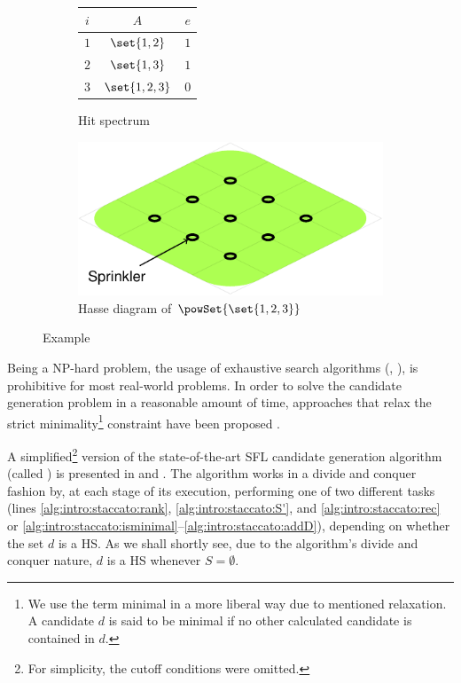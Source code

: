 \begin{figure}[ht]
  \begin{subfigure}{0.4\columnwidth}
    \begin{tabular}{c|c|c}
      $i$ & $A$           & $e$ \\\hline
      $1$ & $\set{1,2}$   & $1$ \\
      $2$ & $\set{1,3}$   & $1$ \\
      $3$ & $\set{1,2,3}$ & $0$ \\
    \end{tabular}
    \caption{Hit spectrum\label{fig:intro:spectrum-example}}
  \end{subfigure}
  \begin{subfigure}{0.45\columnwidth}
    \includegraphics[page=7]{figures/introduction/figures/main.pdf}
    \caption{Hasse diagram of $\powSet{\set{1,2,3}}$\label{fig:intro:hasse}}
  \end{subfigure}
  \caption{Example}
\end{figure}





Being a NP-hard problem, the usage of exhaustive search algorithms
(\eg, \cite{Reiter87,Wotawa01}), is prohibitive for most real-world
problems.
%
In order to solve the candidate generation problem in a reasonable
amount of time, approaches that relax the strict
minimality\footnote{We use the term minimal in a more liberal way due
  to mentioned relaxation. A candidate $d$ is said to be minimal if no
  other calculated candidate is contained in $d$.} constraint have
been proposed \cite{Abreu09b,Kleer92,Feldman08}.

A simplified\footnote{For simplicity, the cutoff conditions were
  omitted.} version of the state-of-the-art \ac{SFL} candidate
generation algorithm (called \staccato{}) \cite{Abreu09b} is
presented in  and
.
%
The algorithm works in a divide and conquer fashion by, at each stage
of its execution, performing one of two different tasks (lines
\ref{alg:intro:staccato:rank},
\ref{alg:intro:staccato:S'}, and
\ref{alg:intro:staccato:rec} or
\ref{alg:intro:staccato:isminimal}--\ref{alg:intro:staccato:addD}),
depending on whether the set $d$ is a \ac{HS}.
%
As we shall shortly see, due to the algorithm's divide and conquer
nature, $d$ is a \ac{HS} whenever $S = \emptyset$.

